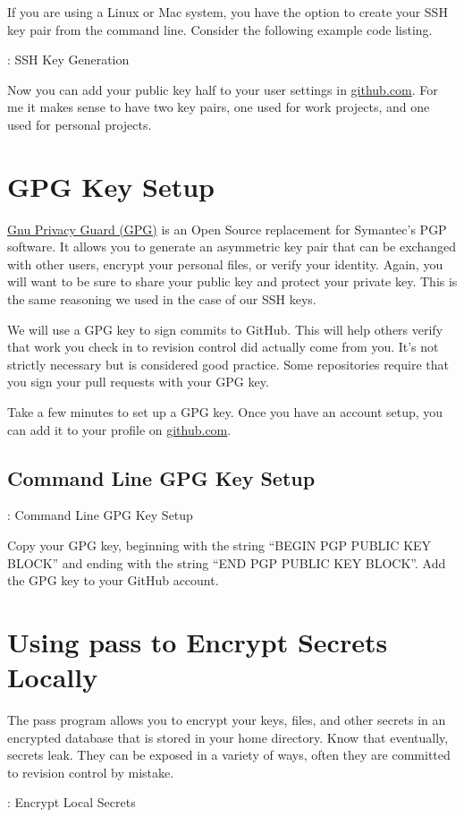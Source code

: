 If you are using a Linux or Mac system, you have the option to create your SSH key pair from the command line. Consider 
the following example code listing.

\begin{mybox}{\thetcbcounter: SSH Key Generation}

\end{mybox}

\justify{}
Now you can add your public key half to your user settings in \href{github.com}{github.com}. For me it makes sense to have
two key pairs, one used for work projects, and one used for personal projects.

\section{GPG Key Setup}

\justify{}
\href{https://gnupg.org/}{Gnu Privacy Guard (GPG)} is an Open Source replacement for Symantec's PGP software. It allows you
to generate an asymmetric key pair that can be exchanged with other users, encrypt your personal files, or verify your identity.
Again, you will want to be sure to share your public key and protect your private key. This is the same reasoning we used in the
case of our SSH keys.

\justify{}
We will use a GPG key to sign commits to GitHub. This will help others verify that work you check in to revision
control did actually come from you. It's not strictly necessary but is considered good practice.
Some repositories require that you sign your pull requests with your GPG key.

\justify{}
Take a few minutes to set up a GPG key. Once you have an account setup, you can add
it to your profile on \href{github.com}{github.com}.

\subsection{Command Line GPG Key Setup}

\begin{mybox}{\thetcbcounter: Command Line GPG Key Setup}

\end{mybox}

\justify{}
Copy your GPG key, beginning with the string ``BEGIN PGP PUBLIC KEY BLOCK'' and ending with the string
``END PGP PUBLIC KEY BLOCK''. Add the GPG key to your GitHub account.

\section{Using pass to Encrypt Secrets Locally}

\justify{}
The pass program allows you to encrypt your keys, files, and other secrets in an encrypted database that is
stored in your home directory. Know that eventually, secrets leak. They can be exposed in a variety of ways, 
often they are committed to revision control by mistake.

\begin{mybox}{\thetcbcounter: Encrypt Local Secrets}

\end{mybox}
